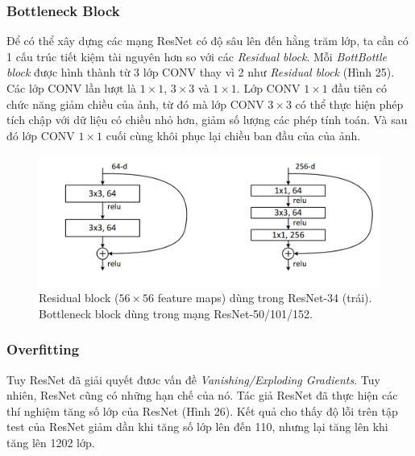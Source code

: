 \documentclass[a4paper, 12pt]{article}
\begin{document}
\subsubsection{Bottleneck Block}
Để có thể xây dựng các mạng ResNet có độ sâu lên đến hằng trăm lớp, ta cần có 1 cấu trúc tiết kiệm tài nguyên hơn so với các \textit{Residual block}. Mỗi \textit{BottBottle block} được hình thành từ 3 lớp CONV thay vì 2 như \textit{Residual block} (Hình 25). Các lớp CONV lần lượt là $1 \times 1$, $3 \times 3$ và $1 \times 1$. Lớp CONV $1 \times 1$ đầu tiên có chức năng giảm chiều của ảnh, từ đó mà lớp CONV $3 \times 3$ có thể thực hiện phép tích chập với dữ liệu có chiều nhỏ hơn, giảm số lượng các phép tính toán. Và sau đó lớp CONV $1 \times 1$ cuối cùng khôi phục lại chiều ban đầu của của ảnh. 

\begin{figure}[H]
    \begin{center}
        \includegraphics[scale=0.4]{img/bottleneck-block}
        \caption{Residual block ($56 \times 56$ feature maps) dùng trong ResNet-34 (trái). Bottleneck block dùng trong mạng ResNet-50/101/152.}
    \end{center}
\end{figure}
\subsubsection{Overfitting}
Tuy ResNet đã giải quyết đươc vấn đề \textit{Vanishing/Exploding Gradients}. Tuy nhiên, ResNet cũng có những hạn chế của nó. Tác giả ResNet đã thực hiện các thí nghiệm tăng số lớp của ResNet (Hình 26). Kết quả cho thấy độ lỗi trên tập test của ResNet giảm dần khi tăng số lớp lên đến 110, nhưng lại tăng lên khi tăng lên 1202 lớp. 
\end{document}
